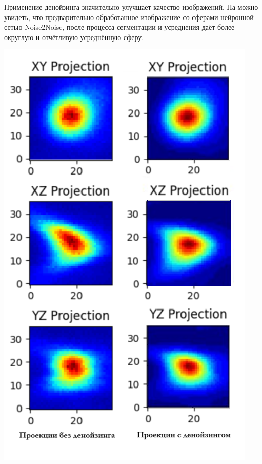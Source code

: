 \par Применение денойзинга значительно улучшает качество изображений.  На  можно увидеть, что предварительно обработанное изображение со сферами нейронной сетью Noise2Noise, после процесса сегментации и усреднения даёт более округлую и отчётливую усреднённую сферу. 
\begin{minipage}{\textwidth}
	\centering
	\vspace{\mfloatsep} %
	\includegraphics[keepaspectratio=true,scale=0.57] {my_folder/images/autosegm/autosegm_res_denoised.png}
	\label{fig:autosegm-res-denoise}  
	\vspace{\mfloatsep} %
\end{minipage}

